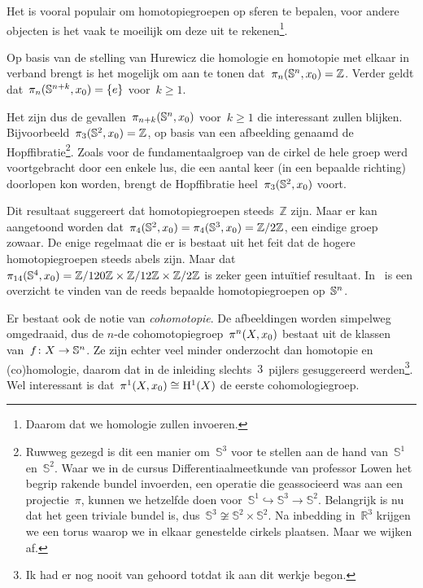 \documentclass[a4paper,11pt,openany,oneside,article]{memoir}
\begin{document}
\begin{example}
  Het is vooral populair om homotopiegroepen op sferen te bepalen, voor andere objecten is het vaak te moeilijk om deze uit te rekenen\footnote{Daarom dat we homologie zullen invoeren.}.

  Op basis van de stelling van Hurewicz die homologie en homotopie met elkaar in verband brengt is het mogelijk om aan te tonen dat~$\pi_n(\mathbb{S}^n,x_0)=\mathbb{Z}$. Verder geldt dat~$\pi_n(\mathbb{S}^{n+k},x_0)=\left\{ e \right\}$ voor~$k\geq 1$.

  Het zijn dus de gevallen~$\pi_{n+k}(\mathbb{S}^n,x_0)$ voor~$k\geq 1$ die interessant zullen blijken. Bijvoorbeeld~$\pi_3(\mathbb{S}^2,x_0)=\mathbb{Z}$, op basis van een afbeelding genaamd de Hopf{}fibratie\footnote{Ruwweg gezegd is dit een manier om~$\mathbb{S}^3$ voor te stellen aan de hand van~$\mathbb{S}^1$ en~$\mathbb{S}^2$. Waar we in de cursus Differentiaalmeetkunde van professor Lowen het begrip rakende bundel invoerden, een operatie die geassocieerd was aan een projectie~$\pi$, kunnen we hetzelfde doen voor~$\mathbb{S}^1\hookrightarrow\mathbb{S}^3\to\mathbb{S}^2$. Belangrijk is nu dat het geen triviale bundel is, dus~$\mathbb{S}^3\not\cong\mathbb{S}^2\times\mathbb{S}^2$. Na inbedding in~$\mathbb{R}^3$ krijgen we een torus waarop we in elkaar genestelde cirkels plaatsen. Maar we wijken af.}. Zoals voor de fundamentaalgroep van de cirkel de hele groep werd voortgebracht door een enkele lus, die een aantal keer (in een bepaalde richting) doorlopen kon worden, brengt de Hopf{}fibratie heel~$\pi_3(\mathbb{S}^2,x_0)$ voort.
  
  Dit resultaat suggereert dat homotopiegroepen steeds~$\mathbb{Z}$ zijn. Maar er kan aangetoond worden dat~$\pi_4(\mathbb{S}^2,x_0)=\pi_4(\mathbb{S}^3,x_0)=\mathbb{Z}/2\mathbb{Z}$, een eindige groep zowaar. De enige regelmaat die er is bestaat uit het feit dat de hogere homotopiegroepen steeds abels zijn. Maar dat~$\pi_{14}(\mathbb{S}^4,x_0)=\mathbb{Z}/120\mathbb{Z}\times\mathbb{Z}/12\mathbb{Z}\times\mathbb{Z}/2\mathbb{Z}$ is zeker geen intu\"itief resultaat. In~\cite{composition-methods} is een overzicht te vinden van de reeds bepaalde homotopiegroepen op~$\mathbb{S}^n$.
\end{example}

\begin{remark}
  Er bestaat ook de notie van \emph{cohomotopie}. De afbeeldingen worden simpelweg omgedraaid, dus de $n$\nobreakdash-de cohomotopiegroep~$\pi^n(X,x_0)$ bestaat uit de klassen van~$f\colon X\to\mathbb{S}^n$. Ze zijn echter veel minder onderzocht dan homotopie en (co)homologie, daarom dat in de inleiding slechts~$3$~pijlers gesuggereerd werden\footnote{Ik had er nog nooit van gehoord totdat ik aan dit werkje begon.}. Wel interessant is dat~$\pi^1(X,x_0)\cong\mathrm{H}^1(X)$ de eerste cohomologiegroep.
\end{remark}
\end{document}
